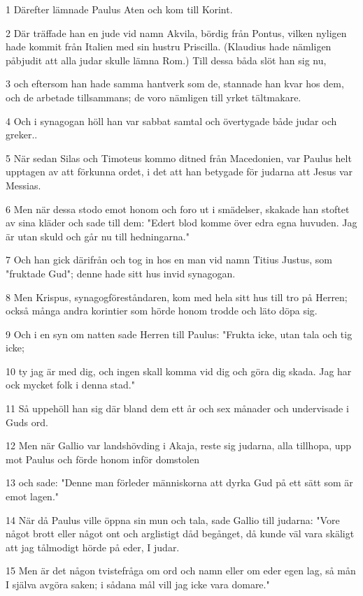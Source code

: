 \par 1 Därefter lämnade Paulus Aten och kom till Korint.
\par 2 Där träffade han en jude vid namn Akvila, bördig från Pontus, vilken nyligen hade kommit från Italien med sin hustru Priscilla. (Klaudius hade nämligen påbjudit att alla judar skulle lämna Rom.) Till dessa båda slöt han sig nu,
\par 3 och eftersom han hade samma hantverk som de, stannade han kvar hos dem, och de arbetade tillsammans; de voro nämligen till yrket tältmakare.
\par 4 Och i synagogan höll han var sabbat samtal och övertygade både judar och greker..
\par 5 När sedan Silas och Timoteus kommo ditned från Macedonien, var Paulus helt upptagen av att förkunna ordet, i det att han betygade för judarna att Jesus var Messias.
\par 6 Men när dessa stodo emot honom och foro ut i smädelser, skakade han stoftet av sina kläder och sade till dem: "Edert blod komme över edra egna huvuden. Jag är utan skuld och går nu till hedningarna."
\par 7 Och han gick därifrån och tog in hos en man vid namn Titius Justus, som "fruktade Gud"; denne hade sitt hus invid synagogan.
\par 8 Men Krispus, synagogföreståndaren, kom med hela sitt hus till tro på Herren; också många andra korintier som hörde honom trodde och läto döpa sig.
\par 9 Och i en syn om natten sade Herren till Paulus: "Frukta icke, utan tala och tig icke;
\par 10 ty jag är med dig, och ingen skall komma vid dig och göra dig skada. Jag har ock mycket folk i denna stad."
\par 11 Så uppehöll han sig där bland dem ett år och sex månader och undervisade i Guds ord.
\par 12 Men när Gallio var landshövding i Akaja, reste sig judarna, alla tillhopa, upp mot Paulus och förde honom inför domstolen
\par 13 och sade: "Denne man förleder människorna att dyrka Gud på ett sätt som är emot lagen."
\par 14 När då Paulus ville öppna sin mun och tala, sade Gallio till judarna: "Vore något brott eller något ont och arglistigt dåd begånget, då kunde väl vara skäligt att jag tålmodigt hörde på eder, I judar.
\par 15 Men är det någon tvistefråga om ord och namn eller om eder egen lag, så mån I själva avgöra saken; i sådana mål vill jag icke vara domare."
